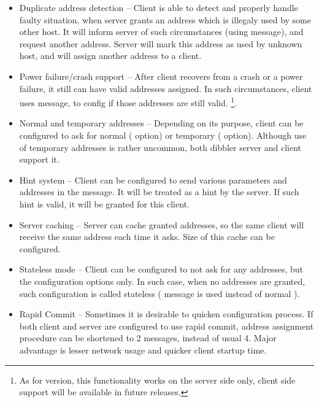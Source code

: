 \begin{itemize}
      could send messages directly to a server's unicast address, so
      additional servers does not need to process those messages. It also
      improves effciency, as all nodes present in LAN segment receive
      multicast packets.\footnote{Nodes, which do not belong to specific
      multicast group, drop those packets silently. However, determining
      if host belongs or not to a group must be performed on each
      node. Also using multicast communication increases the network load.}
\item Duplicate address detection -- Client is able to detect and
      properly handle faulty situation, when server grants an address
      which is illegaly used by some other host. It will inform
      server of such circumstances (using  message), and
      request another address. Server will mark this address as used by
      unknown host, and will assign another address to a client.
\item Power failure/crash support -- After client recovers from a crash or
      a power failure, it still can have valid addresses assigned. In such
      circumstances, client uses  message, to config if
      those addresses are still valid. \footnote{As for \version
      version, this functionality works on the server side only,
      client side support will be available in future releases.}.
\item Normal and temporary addresses -- Depending on its purpose,
      client can be configured to ask for normal ( option)
      or temporary ( option). Although use of temporary
      addresses is rather uncommon, both dibbler server and client
      support it.
\item Hint system -- Client can be configured to send various parameters
      and addresses in the  message. It will be treated as
      a hint by the server. If such hint is valid, it will be granted
      for this client.
\item Server caching -- Server can cache granted addresses, so the same
      client will receive the same address each time it asks. Size of
      this cache can be configured.
\item Stateless mode -- Client can be configured to not ask for any
      addresses, but the configuration options only. In such case, when
      no addresses are granted, such configuration is called stateless
      ( message is used instead of normal
      ).
\item Rapid Commit -- Sometimes it is desirable to quicken configuration
      process. If both client and server are configured to use rapid
      commit, address assignment procedure can be shortened to 2
      messages, instead of usual 4. Major advantage is lesser network
      usage and quicker client startup time.
\end{itemize}

